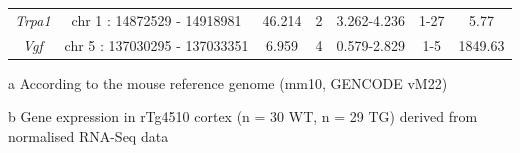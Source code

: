 \begin{landscape}
\begin{table}[]
\begin{threeparttable}
\begin{tabular}{@{}ccccccc@{}}
		\textit{Trpa1}  & chr 1 : 14872529 - 14918981    & 46.214  & 2  & 3.262-4.236  & 1-27 & 5.77     \\
		\textit{Vgf}    & chr 5 : 137030295 - 137033351  & 6.959   & 4  & 0.579-2.829  & 1-5  & 1849.63  \\ \bottomrule
	\end{tabular}
\begin{tablenotes}
	\footnotesize
	\item[a] According to the mouse reference genome (mm10, GENCODE vM22)
	\item[b] Gene expression in rTg4510 cortex (n = 30 WT, n = 29 TG) derived from normalised RNA-Seq data\cite{Castanho2020}
\end{tablenotes}
\end{threeparttable}
\end{table}
\end{landscape}
\restoregeometry



